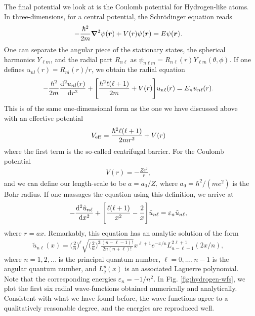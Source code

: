 The final potential we look at is the Coulomb potential for Hydrogen-like atoms.
In three-dimensions, for a central potential, the Schr\"{o}dinger equation reads
\begin{align}
    -\frac{\hbar^2}{2m} \grad^2 \psi(\vb*{r}) + V(r) \psi(\vb*{r}) = E \psi(\vb*{r})
.\end{align}
One can separate the angular piece of the stationary states, the spherical harmonics $Y_{\ell m}$, and the radial part $R_{n \ell}$ as $\psi_{n \ell m} = R_{n \ell}(r) Y_{\ell m}(\theta,\phi)$.
If one defines $u_{nl}(r) = R_{nl}(r) / r$, we obtain the radial equation
\begin{align}
    -\frac{\hbar^2}{2m} \dv[2]{u_{nl}(r)}{r} + \Bigg[ \frac{\hbar^2 \ell(\ell + 1)}{2m} + V(r) \Bigg] u_{n \ell}(r) = E_{n} u_{n \ell}(r)
.\end{align}
This is of the same one-dimensional form as the one we have discussed above with an effective potential
\begin{align}
    V_{\rm eff} = \frac{\hbar^2 \ell (\ell + 1)}{2 m r^2} + V(r)
\end{align}
where the first term is the so-called centrifugal barrier.
For the Coulomb potential
\begin{align}
    V(r) = -\frac{Z e^2}{r}
,\end{align}
and we can define our length-scale to be $a = a_0 / Z$, where $a_0 = \hbar^2/(m e^2)$ is the Bohr radius.
If one massages the equation using this definition, we arrive at
\begin{align}
    -\dv[2]{\tilde{u}_{n\ell}}{x} + \Bigg[ \frac{\ell (\ell + 1)}{x^2} - \frac{2}{x} \Bigg] \tilde{u}_{n \ell} = \varepsilon_{n} \tilde{u}_{n \ell}
,\end{align}
where $r = a x$.
Remarkably, this equation has an analytic solution of the form
\begin{align}
    \tilde{u}_{n \ell}(x) = \Big( \frac{2}{n} \Big)^{\ell} \sqrt{\Big( \frac{2}{n} \Big)^3 \frac{(n - \ell - 1)!}{2n (n + \ell)!}} x^{\ell + 1} e^{-x/n} L_{n-\ell-1}^{2 \ell + 1}(2x/n)
,\end{align}
where $n = 1,2,\ldots$ is the principal quantum number, $\ell = 0,\ldots,n-1$ is the angular quantum number, and $L_{q}^{p}(x)$ is an associated Laguerre polynomial.
Note that the corresponding energies $\varepsilon_{n} = -1/n^2$.
In Fig. \ref{fig:hydrogen-wfs}, we plot the first six radial wave-functions obtained numerically and analytically.
Consistent with what we have found before, the wave-functions agree to a qualitatively reasonable degree, and the energies are reproduced well.

